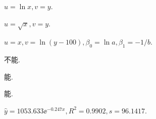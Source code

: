 \begin{answer}
  \item $u=\ln x,v=y$.
  \item $u=\sqrt x,v=y$.
  \item $u=x,v=\ln(y-100),\beta_0=\ln a,\beta_1=-1/b$.
  \item 不能.
  \item 能.
  \item 能.
  \item $\hat y=1053.633\ee^{-0.247x},R^2=0.9902,s=96.1417$.
\end{answer}


